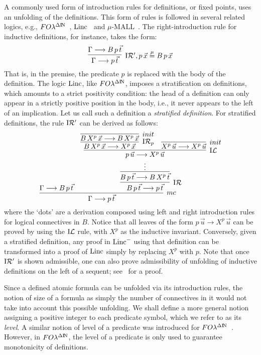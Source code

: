 \documentclass[preprint]{elsarticle}
\newcommand{\FOL   }{FO\lambda}
\newcommand{\FOLDN }{\FOL^{\Delta\N}}
\newcommand{\Linc}{{\rm Linc}^-}
\newcommand{\fLinc}{{\rm Linc}}
\newcommand{\N}{{\rm I} \! {\rm N}}
\newcommand{\Seq}[2]{#1\longrightarrow #2}
\newcommand{\defmu}{\stackrel{\mu}{=}}
\newcommand{\indR}{{\rm I}{\cal R}}
\newcommand{\indRP}{{\rm I}{\cal R}_p}
\newcommand{\indL}{{\rm I}{\cal L}}
\begin{document}
\begin{remark}

\label{rem:unf}
  A commonly used form of introduction rules for definitions, or fixed
  points, uses an unfolding of the definitions.  This form of rules is
  followed in several related logics, e.g.,
  $\FOLDN$~\cite{mcdowell00tcs},
  $\fLinc$~\cite{Momigliano03TYPES,tiu04phd} and
  $\mu$-MALL~\cite{baelde07lpar}.  The right-introduction rule for
  inductive definitions, for instance, takes the form:
$$
\infer[\indR', p\,\vec x \defmu B\,p\,\vec x] {\Seq{\Gamma}{p\,\vec
    t}} {\Seq{\Gamma}{B\,p\,\vec t} }
$$
That is, in the premise, the predicate $p$ is replaced with the body
of the definition.  The logic $\fLinc$, like $\FOLDN$, imposes a
stratification on definitions, which amounts to a strict
positivity condition: the head of a definition can only appear in a
strictly positive position in the body, i.e., it never appears to the
left of an implication. Let us call such a definition a \emph{stratified definition}.  
For stratified definitions, the rule $\indR'$ can be derived as follows:
$$
\infer[mc] {\Seq{\Gamma}{p\,\vec t}} {\Seq{\Gamma}{B\,p\,\vec t} &
  \infer[\indR] {\Seq{B\,p\,\vec t}{p\,\vec t}} {\infer[]
    {\Seq{B\,p\,\vec t}{B\,X^p\,\vec t}} {\deduce{\vdots} {
        \infer[\indL] {\Seq{p\,\vec u}{X^p\,\vec u}} {\infer[\indRP]
          {\Seq{B\,X^p\,\vec x}{X^p\,\vec x}} {\infer[init]
            {\Seq{B\,X^p\,\vec x}{B\,X^p\,\vec x}} {} } & \infer[init]
          {\Seq{X^p\,\vec u}{X^p\,\vec u}}{} } } } } }
$$
where the `dots' are a derivation composed using left and right
introduction rules for logical connectives in $B$.  Notice that all
leaves of the form $\Seq{p\,\vec u}{X^p\,\vec u}$ can be proved by
using the $\indL$ rule, with $X^p$ as the inductive invariant.
Conversely, given a stratified definition, any proof in
$\Linc$ using that definition can be transformed into a proof of
$\fLinc$ simply by replacing $X^p$ with $p$.  Note that once $\indR'$
is shown admissible, one can also prove admissibility of unfolding of
inductive definitions on the left of a sequent; see~\cite{tiu04phd}
for a proof.
\end{remark}


Since a defined atomic formula can be unfolded via its introduction rules, 
the notion of size of a formula as simply the number of connectives
in it would not take into account this possible unfolding. We shall
define a more general notion assigning a positive integer to each predicate symbol, which we refer 
to as its \emph{level}. A similar notion of level of a predicate was introduced for
$\FOLDN$~\cite{mcdowell00tcs}.  However, in $\FOLDN$, the level of
a predicate is only used to guarantee monotonicity of definitions.
\end{document}
